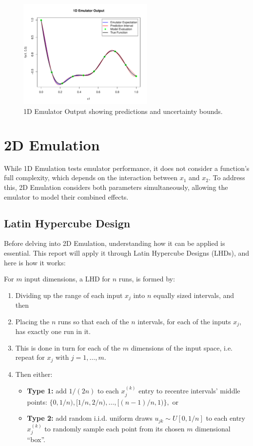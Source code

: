 \documentclass[12pt]{report} %
\begin{document}
\begin{figure}[H]
    \centering
    \includegraphics[width=0.6\textwidth]{1D Emulation.pdf}
    \caption{1D Emulator Output showing predictions and uncertainty bounds.}
    \label{fig:1d_emulator}
\end{figure}

\section{2D Emulation}
While 1D Emulation tests emulator performance, it does not consider a function's full complexity, which depends on the interaction between $x_1$ and $x_2$. To address this, 2D Emulation considers both parameters simultaneously, allowing the emulator to model their combined effects.

\subsection{Latin Hypercube Design}
Before delving into 2D Emulation, understanding how it can be applied is essential. This report will apply it through Latin Hypercube Designs (LHDs), and here is how it works:

\noindent For $m$ input dimensions, a LHD for $n$ runs, is formed by:
\begin{enumerate}
    \item Dividing up the range of each input $x_j$ into $n$ equally sized intervals, and then
    
    \item Placing the $n$ runs so that each of the $n$ intervals, for each of the inputs $x_j$, has exactly one run in it.\cite{vernon2024}
    
    \item This is done in turn for each of the $m$ dimensions of the input space, i.e. repeat for $x_j$ with $j = 1, \ldots, m$.\cite{vernon2024}
    
    \item Then either:
    \begin{itemize}
        \item \textbf{Type 1:} add $1/(2n)$ to each $x_j^{(k)}$ entry to recentre intervals' middle points: $\{0, 1/n), [1/n, 2/n), \ldots, [(n-1)/n, 1)\},$
        or
        \item \textbf{Type 2:} add random i.i.d. uniform draws $u_{jk} \sim U[0, 1/n]$ to each entry $x_j^{(k)}$ to randomly sample each point from its chosen $m$ dimensional ``box''.\cite{vernon2024}
    \end{itemize}
\end{enumerate}
\end{document}
